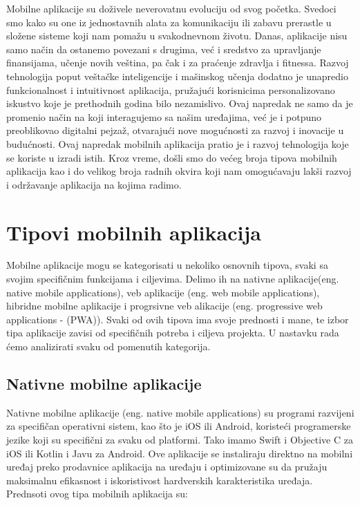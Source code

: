 \documentclass[12pt,oneside]{memoir}
\begin{document}
Mobilne aplikacije su doživele neverovatnu evoluciju od svog početka. Svedoci smo kako su one iz jednostavnih alata za komunikaciju ili zabavu prerastle u složene sisteme koji nam pomažu u svakodnevnom životu. Danas, aplikacije nisu samo način da ostanemo povezani s drugima, već i sredstvo za upravljanje finansijama, učenje novih veština, pa čak i za praćenje zdravlja i fitnessa. Razvoj tehnologija poput veštačke inteligencije i mašinskog učenja dodatno je unapredio funkcionalnost i intuitivnost aplikacija, pružajući korisnicima personalizovano iskustvo koje je prethodnih godina bilo nezamislivo. Ovaj napredak ne samo da je promenio način na koji interagujemo sa našim uređajima, već je i potpuno preoblikovao digitalni pejzaž, otvarajući nove mogućnosti za razvoj i inovacije u budućnosti. Ovaj napredak mobilnih aplikacija pratio je i razvoj tehnologija koje se koriste u izradi istih. Kroz vreme, došli smo do većeg broja tipova mobilnih aplikacija kao i do velikog broja radnih okvira koji nam omogućavaju lakši razvoj i održavanje aplikacija na kojima radimo.

\section{Tipovi mobilnih aplikacija}

Mobilne aplikacije mogu se kategorisati u nekoliko osnovnih tipova, svaki sa svojim specifičnim funkcijama i ciljevima. Delimo ih na nativne aplikacije(eng. native mobile applications), veb aplikacije (eng. web mobile applications), hibridne mobilne aplikacije i progrsivne veb alikacije (eng. progressive web applications - (PWA)). Svaki od ovih tipova ima svoje prednosti i mane, te izbor tipa aplikacije zavisi od specifičnih potreba i ciljeva projekta. U nastavku rada ćemo analizirati svaku od pomenutih kategorija.

\subsection{Nativne mobilne aplikacije}

Nativne mobilne aplikacije (eng. native mobile applications) su programi razvijeni za specifičan operativni sistem, kao što je iOS ili Android, koristeći programerske jezike koji su specifični za svaku od platformi. Tako imamo Swift i Objective C za iOS ili Kotlin i Javu za Android. Ove aplikacije se instaliraju direktno na mobilni uređaj preko prodavnice aplikacija na uređaju i optimizovane su da pružaju maksimalnu efikasnost i iskoristivost hardverskih karakteristika uređaja. Prednsoti ovog tipa mobilnih aplikacija su:
\end{document}
